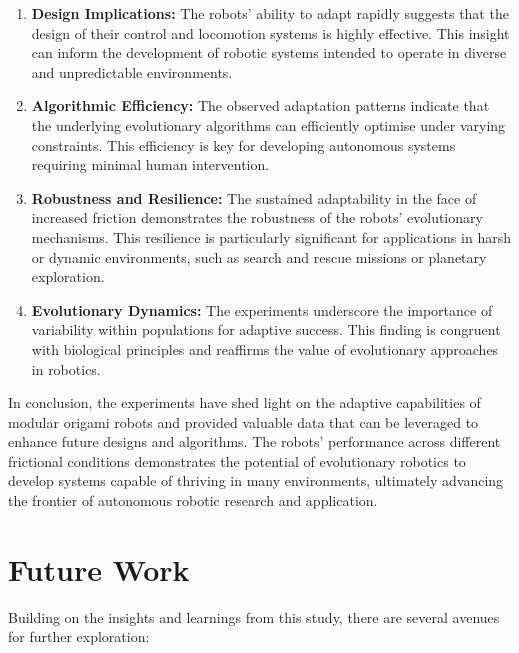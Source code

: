 \documentclass{sigchi}
\begin{document}
\begin{enumerate}
    \item \textbf{Design Implications:} The robots' ability to adapt rapidly suggests that the design of their control and locomotion systems is highly effective. This insight can inform the development of robotic systems intended to operate in diverse and unpredictable environments.
    
    \item \textbf{Algorithmic Efficiency:} The observed adaptation patterns indicate that the underlying evolutionary algorithms can efficiently optimise under varying constraints. This efficiency is key for developing autonomous systems requiring minimal human intervention.
    
    \item \textbf{Robustness and Resilience:} The sustained adaptability in the face of increased friction demonstrates the robustness of the robots' evolutionary mechanisms. This resilience is particularly significant for applications in harsh or dynamic environments, such as search and rescue missions or planetary exploration.
    
    \item \textbf{Evolutionary Dynamics:} The experiments underscore the importance of variability within populations for adaptive success. This finding is congruent with biological principles and reaffirms the value of evolutionary approaches in robotics.
\end{enumerate}

In conclusion, the experiments have shed light on the adaptive capabilities of modular origami robots and provided valuable data that can be leveraged to enhance future designs and algorithms. The robots' performance across different frictional conditions demonstrates the potential of evolutionary robotics to develop systems capable of thriving in many environments, ultimately advancing the frontier of autonomous robotic research and application.
 


\section{Future Work}

Building on the insights and learnings from this study, there are several avenues for further exploration:
\end{document}
